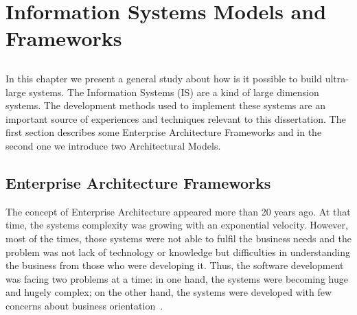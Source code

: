 \chapter{Information Systems Models and Frameworks} \label{chap:inf-sys}

\section*{}

%


%
%
%
%

In this chapter we present a general study about how is it possible to build ultra-large systems. The Information Systems (IS) are a kind of large dimension systems. The development methods used to implement these systems are an important source of experiences and techniques relevant to this dissertation. The first section describes some Enterprise Architecture Frameworks and in the second one we introduce two Architectural Models.


\section{Enterprise Architecture Frameworks} \label{sec:ea-frams}
The concept of Enterprise Architecture appeared more than 20 years ago. At that time, the systems complexity was growing with an exponential velocity. However, most of the times, those systems were not able to fulfil the business needs and the problem was not lack of technology or knowledge but difficulties in understanding the business from those who were developing it. Thus, the software development was facing two problems at a time: in one hand, the systems were becoming huge and hugely complex; on the other hand, the systems were developed with few concerns about business orientation~\citep{Sessions2007}.


